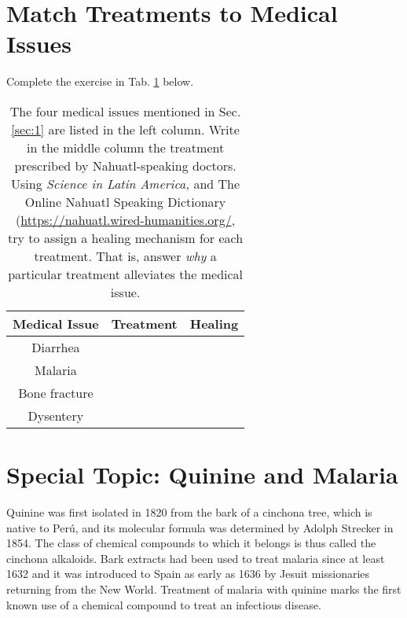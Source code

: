 \documentclass[12pt]{article}
\begin{document}
\section{Match Treatments to Medical Issues}

Complete the exercise in Tab. \ref{tab:1} below.

\begin{table}[hb]
\centering
\begin{tabular}{| c | c | c |}
\hline
\textbf{Medical Issue} & \textbf{Treatment} & \textbf{Healing} \\ \hline
Diarrhea & \hspace{7cm} & \hspace{7cm} \\ \hline
Malaria & \hspace{7cm} & \hspace{7cm} \\ \hline
Bone fracture & \hspace{7cm} & \hspace{7cm} \\ \hline
Dysentery & \hspace{7cm} & \hspace{7cm} \\ \hline
\hline
\end{tabular}
\caption{\label{tab:1} The four medical issues mentioned in Sec. \ref{sec:1} are listed in the left column.  Write in the middle column the treatment prescribed by Nahuatl-speaking doctors.  Using \textit{Science in Latin America,} and The Online Nahuatl Speaking Dictionary (\url{https://nahuatl.wired-humanities.org/}, try to assign a healing mechanism for each treatment.  That is, answer \textit{why} a particular treatment alleviates the medical issue.}
\end{table}

\section{Special Topic: Quinine and Malaria}

Quinine was first isolated in 1820 from the bark of a cinchona tree, which is native to Per\'{u}, and its molecular formula was determined by Adolph Strecker in 1854. The class of chemical compounds to which it belongs is thus called the cinchona alkaloids. Bark extracts had been used to treat malaria since at least 1632 and it was introduced to Spain as early as 1636 by Jesuit missionaries returning from the New World. Treatment of malaria with quinine marks the first known use of a chemical compound to treat an infectious disease.
\end{document}

